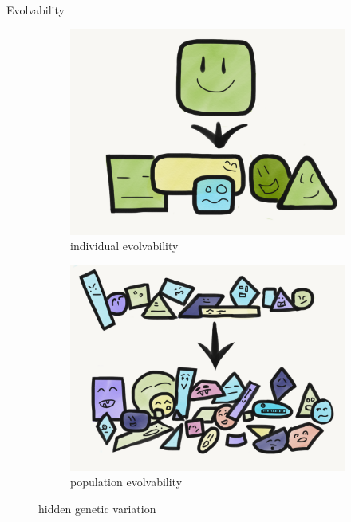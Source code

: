 \begin{frame}{Evolvability}
\begin{figure}
 \centering
    \begin{subfigure}[b]{0.5\textwidth}
        \centering
    	\includegraphics[width=\textwidth]{img/individual_evolvability.png}
        \caption{individual evolvability}
        \label{subfig:individual_evolvability}
    \end{subfigure}%
    \hfill
    \begin{subfigure}[b]{0.5\textwidth}
        \centering
        \includegraphics[width=\textwidth]{img/population_evolvability.png}
        \caption{population evolvability}
        \label{subfig:population_evolvability}
    \end{subfigure}
 	\captionsetup{singlelinecheck=off,justification=raggedright}
    \vspace{-4ex}
  \captionsetup{singlelinecheck=off,justification=raggedright}
  \caption{hidden genetic variation}
\end{figure}
\end{frame}

